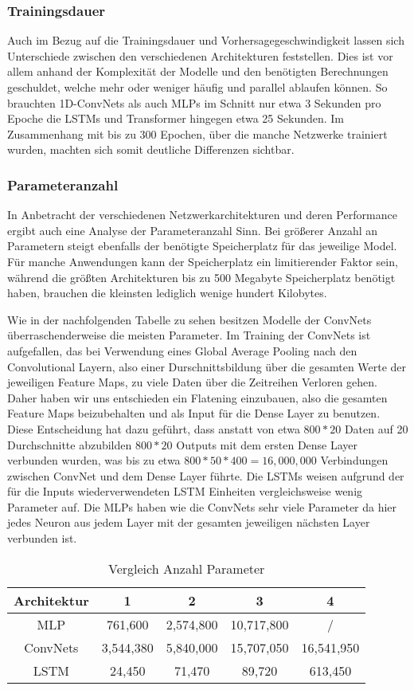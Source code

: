 \documentclass[acmtog, authorversion]{acmart} %
\begin{document}
\subsubsection{Trainingsdauer}
Auch im Bezug auf die Trainingsdauer und Vorhersagegeschwindigkeit lassen sich Unterschiede zwischen den verschiedenen Architekturen feststellen. 
Dies ist vor allem anhand der Komplexität der Modelle und den benötigten Berechnungen geschuldet, welche mehr oder weniger häufig und parallel ablaufen können.
So brauchten 1D-ConvNets als auch MLPs im Schnitt nur etwa 3 Sekunden pro Epoche die LSTMs und Transformer hingegen etwa 25 Sekunden.
Im Zusammenhang mit bis zu 300 Epochen, über die manche Netzwerke trainiert wurden, machten sich somit deutliche Differenzen sichtbar.

\subsubsection{Parameteranzahl}

In Anbetracht der verschiedenen Netzwerkarchitekturen und deren Performance ergibt auch eine Analyse der Parameteranzahl Sinn. Bei größerer Anzahl an Parametern steigt ebenfalls der benötigte Speicherplatz für das jeweilige Model. Für manche Anwendungen kann der Speicherplatz ein limitierender Faktor sein, während die größten Architekturen bis zu 500 Megabyte Speicherplatz benötigt haben, brauchen die kleinsten lediglich wenige hundert Kilobytes. 

Wie in der nachfolgenden Tabelle zu sehen besitzen Modelle der ConvNets überraschenderweise die meisten Parameter. Im Training der ConvNets ist aufgefallen, das bei Verwendung eines Global Average Pooling nach den Convolutional Layern, also einer Durschnittsbildung über die gesamten Werte der jeweiligen Feature Maps, zu viele Daten über die Zeitreihen Verloren gehen. Daher haben wir uns entschieden ein Flatening einzubauen, also die gesamten Feature Maps beizubehalten und als Input für die Dense Layer zu benutzen. Diese Entscheidung hat dazu geführt, dass anstatt von etwa $800*20$ Daten auf 20 Durchschnitte abzubilden $800*20$ Outputs mit dem ersten Dense Layer verbunden wurden, was bis zu etwa $800*50*400 = 16,000,000$ Verbindungen zwischen ConvNet und dem Dense Layer führte. 
Die LSTMs weisen aufgrund der für die Inputs wiederverwendeten LSTM Einheiten vergleichsweise wenig Parameter auf. Die MLPs haben wie die ConvNets sehr viele Parameter da hier jedes Neuron aus jedem Layer mit der gesamten jeweiligen nächsten Layer verbunden ist.
\begin{table}[htp]
    \centering
    \begin{tabular}{|c|c|c|c|c|}
    \hline
         Architektur & 1 & 2 & 3 & 4  \\
    \hline
         MLP & 761,600 &  2,574,800 & 10,717,800 & / \\
    \hline
          ConvNets& 3,544,380 &  5,840,000 & 15,707,050 & 16,541,950\\
    \hline
        LSTM & 24,450 &  71,470 & 89,720 & 613,450 \\
    \hline
    \end{tabular}
    \caption{Vergleich Anzahl Parameter}
    \label{tab:my_label}
\end{table}
\end{document}
